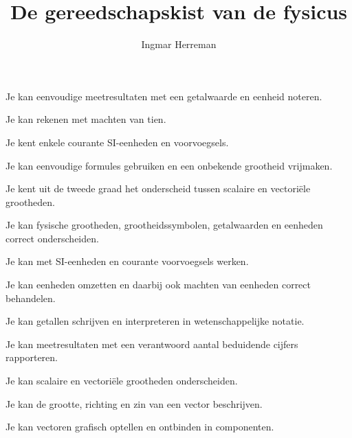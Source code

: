 \documentclass{ximera}
\title{De gereedschapskist van de fysicus}
\author{Ingmar Herreman}
\begin{document}











\maketitle



\begin{voorkennis}
  \item Je kan eenvoudige meetresultaten met een getalwaarde en eenheid noteren.
  \item Je kan rekenen met machten van tien.
  \item Je kent enkele courante SI-eenheden en voorvoegsels.
  \item Je kan eenvoudige formules gebruiken en een onbekende grootheid vrijmaken.
  \item Je kent uit de tweede graad het onderscheid tussen scalaire en vectoriële grootheden.
\end{voorkennis}

\begin{leerdoelen}
  \item Je kan fysische grootheden, grootheidssymbolen, getalwaarden en eenheden correct onderscheiden.
  \item Je kan met SI-eenheden en courante voorvoegsels werken.
  \item Je kan eenheden omzetten en daarbij ook machten van eenheden correct behandelen.
  \item Je kan getallen schrijven en interpreteren in wetenschappelijke notatie.
  \item Je kan meetresultaten met een verantwoord aantal beduidende cijfers rapporteren.
  \item Je kan scalaire en vectoriële grootheden onderscheiden.
  \item Je kan de grootte, richting en zin van een vector beschrijven.
  \item Je kan vectoren grafisch optellen en ontbinden in componenten.
\end{leerdoelen}
\end{document}
